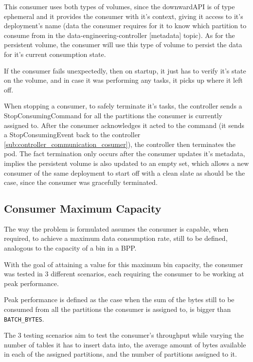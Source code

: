 This consumer uses both types of volumes, since the downwardAPI is of type ephemeral and it provides the consumer with it's context, giving it access to it's deployment's name (data the consumer requires for it to know which partition to consume from in the data-engineering-controller [metadata] topic). As for the persistent volume, the consumer will use this type of volume to persist the data for it's current consumption state.

If the consumer fails unexpectedly, then on startup, it just has to verify it's state on the volume, and in case it was performing any tasks, it picks up where it left off.

When stopping a consumer, to safely terminate it's tasks, the controller sends a StopConsumingCommand for all the partitions the consumer is currently assigned to. After the consumer acknowledges it acted to the command (it sends a StopConsumingEvent back to the controller \ref{sub:controller_communication_cosumer}), the controller then terminates the pod. The fact termination only occurs after the consumer updates it's metadata, implies the persistent volume is also updated to an empty set, which allows a new consumer of the same deployment to start off with a clean slate as should be the case, since the consumer was gracefully terminated.


\subsection{Consumer Maximum Capacity}
\label{c3subsub:consumer_maximum_capacity}

The way the problem is formulated assumes the consumer is capable, when required, to achieve a maximum data consumption rate, still to be defined, analogous to the capacity of a bin in a BPP.

With the goal of attaining a value for this maximum bin capacity, the consumer was tested in 3 different scenarios, each requiring the consumer to be working at peak performance.

Peak performance is defined as the case when the sum of the bytes still to be consumed from all the partitions the consumer is assigned to, is bigger than \lstinline[language=Python]{BATCH_BYTES}.

The 3 testing scenarios aim to test the consumer's throughput while varying the number of tables it has to insert data into, the average amount of bytes available in each of the assigned partitions, and the number of partitions assigned to it.

